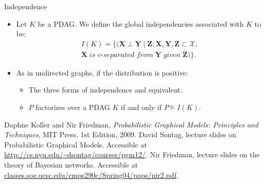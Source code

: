 \documentclass[11pt]{beamer}
\begin{document}
\begin{frame}{Independence}
\begin{itemize}
	\item Let $K$ be a PDAG. We define the global independencies associated
	with $K$ to be:
	\begin{gather*}
		I(K) = \{(\boldsymbol{X} \perp \boldsymbol{Y} \;|\;
		\boldsymbol{Z} : \boldsymbol{X},\boldsymbol{Y},\boldsymbol{Z}
		\subset \mathcal{X},\\
		\boldsymbol{X} \;\textit{is c-separated from}\; \boldsymbol{Y}
		\;\textit{given}\; \boldsymbol{Z})\}.
	\end{gather*}
	\item As in undirected graphs, if the distribution is positive:
	\begin{itemize}
		\item The three forms of independence and equivalent.
		\item $P$ factorizes over a PDAG $K$ if and only if $P \models
		I(K)$.
	\end{itemize}
\end{itemize}
\end{frame}

\begin{thebibliography}{11}
Daphne Koller and Nir Friedman,
\emph{Probabilistic Graphical Models: Principles and Techniques},
MIT Press,
1st Edition,
2009.
David Sontag, lecture slides on Probabilistic Graphical Models.
Accessible at \url{http://cs.nyu.edu/~dsontag/courses/pgm12/}.
Nir Friedman, lecture slides on the theory of Bayesian networks.
Accessible at \url{classes.soe.ucsc.edu/cmps290c/Spring04/paps/nir2.pdf}.
\end{thebibliography}
\end{document}
